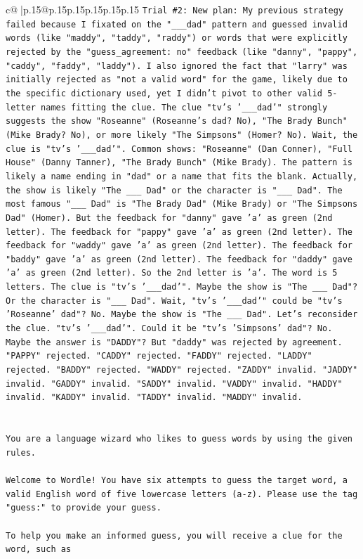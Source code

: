 \documentclass{article}
\begin{document}
{\begin{supertabular}{c@{$\;$}|p{.15\linewidth}@{}p{.15\linewidth}p{.15\linewidth}p{.15\linewidth}p{.15\linewidth}p{.15\linewidth}}
{{{\texttt{Trial \#2: New plan: My previous strategy failed because I fixated on the "\_\_\_dad" pattern and guessed invalid words (like "maddy", "taddy", "raddy") or words that were explicitly rejected by the "guess\_agreement: no" feedback (like "danny", "pappy", "caddy", "faddy", "laddy"). I also ignored the fact that "larry" was initially rejected as "not a valid word" for the game, likely due to the specific dictionary used, yet I didn't pivot to other valid 5{-}letter names fitting the clue. The clue "tv's '\_\_\_dad'" strongly suggests the show "Roseanne" (Roseanne's dad? No), "The Brady Bunch" (Mike Brady? No), or more likely "The Simpsons" (Homer? No). Wait, the clue is "tv's '\_\_\_dad'". Common shows: "Roseanne" (Dan Conner), "Full House" (Danny Tanner), "The Brady Bunch" (Mike Brady). The pattern is likely a name ending in "dad" or a name that fits the blank. Actually, the show is likely "The \_\_\_ Dad" or the character is "\_\_\_ Dad". The most famous "\_\_\_ Dad" is "The Brady Dad" (Mike Brady) or "The Simpsons Dad" (Homer). But the feedback for "danny" gave 'a' as green (2nd letter). The feedback for "pappy" gave 'a' as green (2nd letter). The feedback for "waddy" gave 'a' as green (2nd letter). The feedback for "baddy" gave 'a' as green (2nd letter). The feedback for "daddy" gave 'a' as green (2nd letter). So the 2nd letter is 'a'. The word is 5 letters. The clue is "tv's '\_\_\_dad'". Maybe the show is "The \_\_\_ Dad"? Or the character is "\_\_\_ Dad". Wait, "tv's '\_\_\_dad'" could be "tv's 'Roseanne' dad"? No. Maybe the show is "The \_\_\_ Dad". Let's reconsider the clue. "tv's '\_\_\_dad'". Could it be "tv's 'Simpsons' dad"? No. Maybe the answer is "DADDY"? But "daddy" was rejected by agreement. "PAPPY" rejected. "CADDY" rejected. "FADDY" rejected. "LADDY" rejected. "BADDY" rejected. "WADDY" rejected. "ZADDY" invalid. "JADDY" invalid. "GADDY" invalid. "SADDY" invalid. "VADDY" invalid. "HADDY" invalid. "KADDY" invalid. "TADDY" invalid. "MADDY" invalid.} \\
\\ 
\\ 
\texttt{You are a language wizard who likes to guess words by using the given rules.} \\
\\ 
\texttt{Welcome to Wordle! You have six attempts to guess the target word, a valid English word of five lowercase letters (a{-}z). Please use the tag "guess:" to provide your guess.} \\
\\ 
\texttt{To help you make an informed guess, you will receive a clue for the word, such as} \\
}}}
\end{supertabular}}
\end{document}
